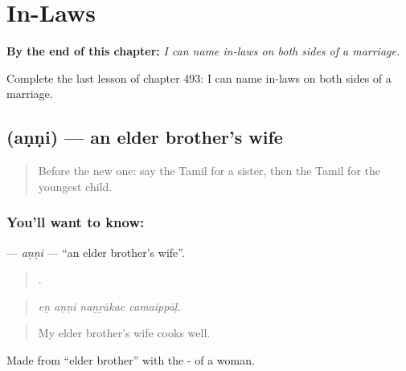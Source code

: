 
\chapter{In-Laws}
\label{ch:ta-in-laws}

\begin{chapteropening}
\textbf{By the end of this chapter:} \emph{I can name in-laws on both sides of a marriage.}

Complete the last lesson of chapter 493: I can name in-laws on both sides of a marriage.
\end{chapteropening}

\section[\texorpdfstring{\ta{அண்ணி} (aṇṇi)}{அண்ணி (aṇṇi)}]{ (aṇṇi) — an elder brother’s wife}

\label{lesson:TA-C493-anni}



\begin{quote}
Before the new one: say the Tamil for a sister, then the Tamil for the youngest child.
\end{quote}

\subsection*{You'll want to know: }
\textbf{} — \emph{aṇṇi} — \textquotedblleft{}an elder brother’s wife\textquotedblright{}.

\begin{quote}
   .
\end{quote}

\begin{quote}
\emph{eṉ aṇṇi naṉṟākac camaippāḷ.}
\end{quote}

\begin{quote}
My elder brother’s wife cooks well.
\end{quote}

Made from  \textquotedblleft{}elder brother\textquotedblright{} with the - of a woman.

